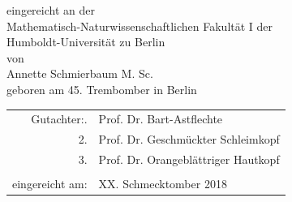\begin{titlepage}
\begin{center}
    \vspace{0.2cm}
    
    \begin{large}
      \begin{center}
	eingereicht an der \\
        \vspace{0.2cm}
    Mathematisch-Naturwissenschaftlichen Fakult\"at I der\\
    Humboldt-Universit\"at zu Berlin\\
        \vspace{0.5cm}
    von \\
        \vspace{0.5cm}
        Annette Schmierbaum M. Sc. \\
        geboren am 45. Trembomber in Berlin
      \end{center}
    \end{large}
    
    \vspace{0.5cm}

    \begin{large}
      \begin{center}
        \begin{tabular}{rl}
	  Gutachter:\qquad
          1. & Prof. Dr. Bart-Astflechte \\
          2. & Prof. Dr. Geschm\"uckter Schleimkopf \\
          3. & Prof. Dr. Orangebl\"attriger Hautkopf \\
             & \\ 
          eingereicht am:     & XX. Schmecktomber 2018
        \end{tabular}
      \end{center}
    \end{large}
    
  \end{center}

\end{titlepage}

\newpage
\thispagestyle{empty}
\quad
\newpage
\setcounter{page}{1}
